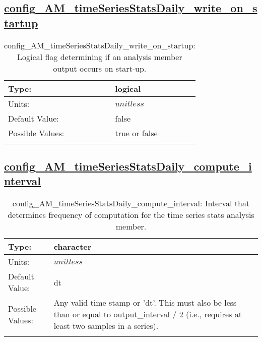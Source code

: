 \subsection[config\_AM\_timeSeriesStatsDaily\_write\_on\_startup]{\hyperref[sec:nm_tab_AM_timeSeriesStatsDaily]{config\_AM\_timeSeriesStatsDaily\_write\_on\_startup}}
\label{subsec:nm_sec_config_AM_timeSeriesStatsDaily_write_on_startup}
\begin{center}
\begin{longtable}{| p{2.0in} || p{4.0in} |}
    \hline
    Type: & logical \\
    \hline
    Units: & $unitless$ \\
    \hline
    Default Value: & false \\
    \hline
    Possible Values: & true or false \\
    \hline
    \caption{config\_AM\_timeSeriesStatsDaily\_write\_on\_startup: Logical flag determining if an analysis member output occurs on start-up.}
\end{longtable}
\end{center}
\subsection[config\_AM\_timeSeriesStatsDaily\_compute\_interval]{\hyperref[sec:nm_tab_AM_timeSeriesStatsDaily]{config\_AM\_timeSeriesStatsDaily\_compute\_interval}}
\label{subsec:nm_sec_config_AM_timeSeriesStatsDaily_compute_interval}
\begin{center}
\begin{longtable}{| p{2.0in} || p{4.0in} |}
    \hline
    Type: & character \\
    \hline
    Units: & $unitless$ \\
    \hline
    Default Value: & dt \\
    \hline
    Possible Values: & Any valid time stamp or 'dt'. This must also be less than or equal to output\_interval / 2 (i.e., requires at least two samples in a series). \\
    \hline
    \caption{config\_AM\_timeSeriesStatsDaily\_compute\_interval: Interval that determines frequency of computation for the time series stats analysis member.}
\end{longtable}
\end{center}
